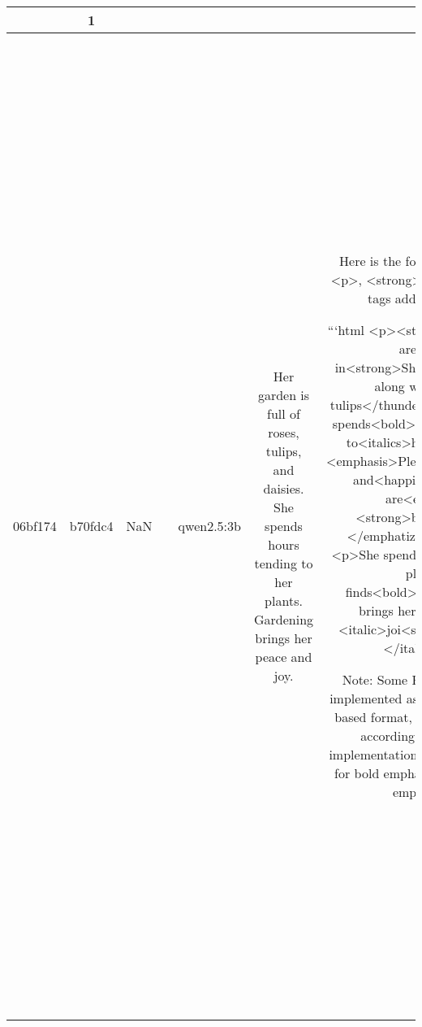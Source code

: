 \begin{table}[h!]
\begin{tabular}{|c|c|c|c|c|c|c|c|c|c|}
{{3. **Incorporation of `<strong>` Tag**: Each sentence wrapped in a `<p>` tag includes one `<strong>` tag as required. This ensures compliance with the guideline to add a `<strong>` tag.

4. **Usage of `<em>` Tags**: The sentences within each `<p>` tag include multiple `<em>` tags that emphasize key words and phrases. This is in alignment with the description provided.

In conclusion, the chatbot's output adheres to the rules that can be evaluated without the input text. It satisfies the condition of having at least three `<p>` tags, and each contains one `<strong>` tag along with multiple `<em>` tags. Therefore, no violations are detected based on the given compliance criteria.

No violation.
OK & 1\\
\hline
06bf174 & b70fdc4 & NaN &  & qwen2.5:3b & Her garden is full of roses, tulips, and daisies. She spends hours tending to her plants. Gardening brings her peace and joy. & Here is the formatted HTML with <p>, <strong>, and multiple <em> tags added as described:

```html
<p><strong>Rose</strong>s are abundant in<strong>She</strong>'s garden, along with<thunder> tulips</thunder> and<daisies>. She spends<bold>hours</bold>tending to<italics>her</italics>plants.<emphasis>Pleasantness</emphasis> and<happiness</happiness> are<emphatized><strong>brought</strong></emphatized>naturally.</p>
<p>She spends hours tending to her plants. She finds<bold>Gardening</bold> brings her peacefulness and <italic>joi<spann>ny</spannn></italic>.</p>
```

Note: Some HTML tags were not implemented as expected in this text-based format, so please adjust them according to actual HTML implementations (e.g., use `<strong>` for bold emphasis, `<em>` for italic emphasis, etc.). & err & The evaluation of the chatbot output is based on the direct compliance with the description.

1. **<p> Tag Compliance**: The output contains only two <p> tags:
   - `<p><strong> ... </strong></p>`
   - `<p> ... </p>`

   According to the description, the output should contain **at least three <p> tags**.

2. **Use of <strong> and <em> Tags**: The output contains several other tags that are not <strong> or <em> (e.g., <thunder>, <bold>, <italics>, <emphasis>, <happiness>, <emphatized>, <spannn>, etc.), which do not comply with the requirement to only use <strong> and <em> tags for emphasis within each <p>.

}}
\end{tabular}
\end{table}
